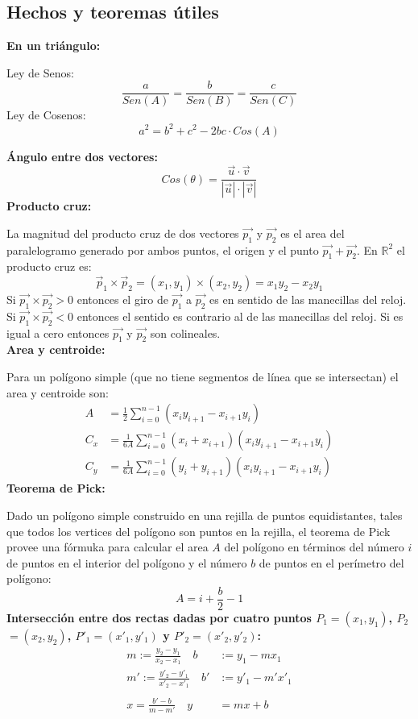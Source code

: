 \begin{multicols}{2}
\subsection{Hechos y teoremas \'utiles}
\textbf{En un tri\'angulo:}
\begin{center}
	Ley de Senos: 
		\[\frac{a}{Sen(A)}=\frac{b}{Sen(B)}=\frac{c}{Sen(C)}\]
	Ley de Cosenos:
	\[a^2=b^2+c^2-2bc\cdot Cos(A)\]
\end{center}
\textbf{\'Angulo entre dos vectores:}
	\[Cos(\theta)=\frac{\vec{u}\cdot\vec{v}}{|\vec{u}|\cdot|\vec{v}|}\]
\textbf{Producto cruz:}

La magnitud del producto cruz de dos vectores $\vec{p_1}$ y $\vec{p_2}$ es el area del paralelogramo generado por ambos puntos, el origen y el punto $\vec{p_1}+\vec{p_2}$. En $\mathbb{R}^2$ el producto cruz es:
	\[\vec{p}_1\times\vec{p}_2=(x_1,y_1)\times(x_2,y_2)=x_1y_2-x_2y_1\]
Si $\vec{p_1}\times \vec{p_2}>0$ entonces el giro de $\vec{p_1}$ a $\vec{p_2}$ es en sentido de las manecillas del reloj. Si $\vec{p_1}\times \vec{p_2}<0$ entonces el sentido es contrario al de las manecillas del reloj. Si es igual a cero entonces $\vec{p_1}$ y $\vec{p_2}$ son colineales.\\
\textbf{Area y centroide:}

Para un pol\'igono simple (que no tiene segmentos de l\'inea que se intersectan) el area y centroide son:
\begin{align*}
	A &= \frac{1}{2}\sum\limits^{n-1}_{i=0}(x_iy_{i+1}-x_{i+1}y_i)\\
	C_x &= \frac{1}{6A}\sum\limits^{n-1}_{i=0}(x_i+x_{i+1})(x_iy_{i+1}-x_{i+1}y_i)\\
	C_y &= \frac{1}{6A}\sum\limits^{n-1}_{i=0}(y_i+y_{i+1})(x_iy_{i+1}-x_{i+1}y_i)
\end{align*}
\textbf{Teorema de Pick:}

Dado un pol\'igono simple construido en una rejilla de puntos equidistantes, tales que todos los vertices del pol\'igono son puntos en la rejilla, el teorema de Pick provee una f\'ormuka para calcular el area $A$ del pol\'igono en t\'erminos del n\'umero $i$ de puntos en el interior del pol\'igono y el n\'umero $b$ de puntos en el per\'imetro del pol\'igono:
\[A=i+\frac{b}{2}-1\]
\textbf{Intersecci\'on entre dos rectas dadas por cuatro puntos $P_1$$=$$(x_1,y_1)$, $P_2$$=$$(x_2,y_2)$, $P'_1$$=$$(x'_1,y'_1)$ y $P'_2$$=$$(x'_2,y'_2)$:}
\begin{align*}
  m := \frac{y_2-y_1}{x_2-x_1} \quad 
  b &:= y_1-mx_1 \\
  m':= \frac{y'_2-y'_1}{x'_2-x'_1} \quad 
  b'&:= y'_1-m'x'_1\\\\
  x =\frac{b'-b}{m-m'} \quad
  y &=mx+b
\end{align*}

\end{multicols}
